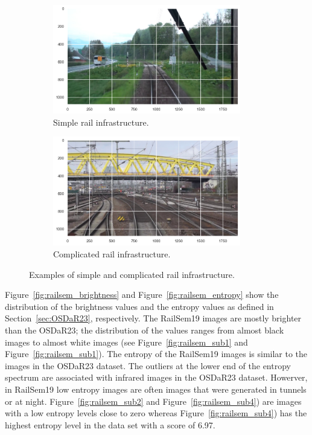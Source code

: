 \documentclass[Master,MDS,english]{BASE/twbook} %
\begin{document}
\begin{figure}
\centering
\begin{subfigure}[t]{.5\textwidth}
  \centering
  \includegraphics[width=0.9\textwidth]{images/datasets/railsem/example_2_tracks}
  \caption{Simple rail infrastructure.}
\end{subfigure}%
\begin{subfigure}[t]{.5\textwidth}
  \centering
  \includegraphics[width=0.9\textwidth]{images/datasets/railsem/example_52_tracks}
  \caption{Complicated rail infrastructure. }
\end{subfigure}
\caption{Examples of simple and complicated rail infrastructure.}
\label{fig:railsem_complicated_vs_simple}
\end{figure}


Figure~\ref{fig:railsem_brightness} and  Figure~\ref{fig:railsem_entropy} show the distribution of the brightness values and the entropy values as defined in Section~\ref{sec:OSDaR23}, respectively. The RailSem19 images are mostly brighter than the OSDaR23; the distribution of the values ranges from almost black images to almost white images (see Figure~\ref{fig:railsem_sub1} and Figure~\ref{fig:railsem_sub1}). The entropy of the RailSem19 images is similar to the images in the OSDaR23 dataset. The outliers at the lower end of the entropy spectrum are associated with infrared images in the OSDaR23 dataset. Howerver, in RailSem19 low entropy images are often images that were generated in tunnels or at night. Figure~\ref{fig:railsem_sub2} and Figure~\ref{fig:railsem_sub4}) are images with a low entropy levels close to zero whereas Figure~\ref{fig:railsem_sub4}) has the highest entropy level in the data set with a score of 6.97.
\end{document}

